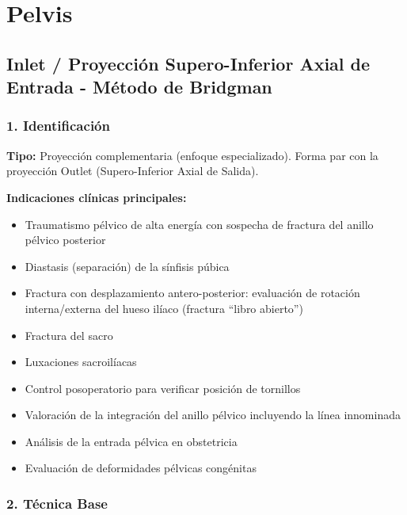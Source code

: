 	
		
		\section{Pelvis}
		
		\subsection{Inlet / Proyección Supero-Inferior Axial de Entrada - Método de Bridgman}
		
		\subsubsection*{1. Identificación}
		
		\textbf{Tipo:} Proyección complementaria (enfoque especializado). Forma par con la proyección Outlet (Supero-Inferior Axial de Salida).
		
		\textbf{Indicaciones clínicas principales:}
		\begin{itemize}
			\item Traumatismo pélvico de alta energía con sospecha de fractura del anillo pélvico posterior
			\item Diastasis (separación) de la sínfisis púbica
			\item Fractura con desplazamiento antero-posterior: evaluación de rotación interna/externa del hueso ilíaco (fractura ``libro abierto'')
			\item Fractura del sacro
			\item Luxaciones sacroilíacas
			\item Control posoperatorio para verificar posición de tornillos
			\item Valoración de la integración del anillo pélvico incluyendo la línea innominada
			\item Análisis de la entrada pélvica en obstetricia
			\item Evaluación de deformidades pélvicas congénitas
		\end{itemize}
		
		\subsubsection*{2. Técnica Base}
		

